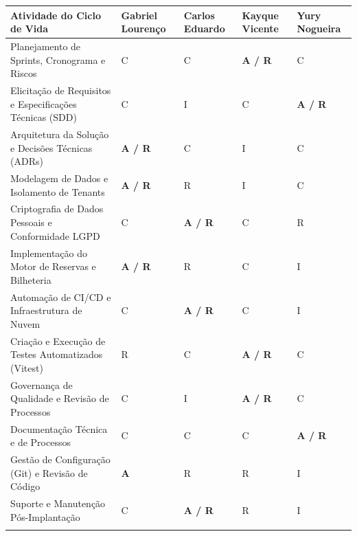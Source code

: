 {\footnotesize
\begin{tabularx}{\textwidth}{>{\hsize\sloppy\arraybackslash}X C{1.69cm} C{1.52cm} C{1.52cm} C{1.69cm}}
\toprule
{}
\textbf{Atividade do Ciclo de Vida} & \textbf{Gabriel Lourenço} & \textbf{Carlos Eduardo} & \textbf{Kayque Vicente} & \textbf{Yury Nogueira} \\
\midrule
{}
Planejamento de Sprints, Cronograma e Riscos & C & C & \textbf{A / R} & C \\
\midrule
Elicitação de Requisitos e Especificações Técnicas (SDD) & C & I & C & \textbf{A / R} \\
\midrule
Arquitetura da Solução e Decisões Técnicas (ADRs) & \textbf{A / R} & C & I & C \\
\midrule
Modelagem de Dados e Isolamento de Tenants & \textbf{A / R} & R & I & C \\
\midrule
Criptografia de Dados Pessoais e Conformidade LGPD & C & \textbf{A / R} & C & R \\
\midrule
Implementação do Motor de Reservas e Bilheteria & \textbf{A / R} & R & C & I \\
\midrule
Automação de CI/CD e Infraestrutura de Nuvem & C & \textbf{A / R} & C & I \\
\midrule
Criação e Execução de Testes Automatizados (Vitest) & R & C & \textbf{A / R} & C \\
\midrule
Governança de Qualidade e Revisão de Processos & C & I & \textbf{A / R} & C \\
\midrule
Documentação Técnica e de Processos & C & C & C & \textbf{A / R} \\
\midrule
Gestão de Configuração (Git) e Revisão de Código & \textbf{A} & R & R & I \\
\midrule
Suporte e Manutenção Pós-Implantação & C & \textbf{A / R} & R & I \\
\bottomrule
\end{tabularx}%
}
